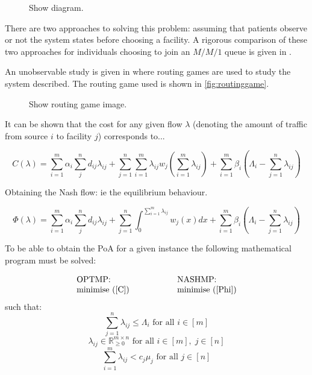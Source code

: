 \documentclass[a4paper,11pt]{article}
\begin{document}
\begin{figure}[!hbtp]
Show diagram.
\end{figure}

There are two approaches to solving this problem: assuming that patients observe or not the system states before choosing a facility.
A rigorous comparison of these two approaches for individuals choosing to join an $M/M/1$ queue is given in \cite{}.

An unobservable study is given in \cite{} where routing games \cite{Rouhgharden} are used to study the system described.
The routing game used is shown in \ref{fig:routinggame}.

\begin{figure}[!hbtp]
Show routing game image.
\end{figure}

It can be shown that the cost for any given flow $\lambda$ (denoting the amount of traffic from source $i$ to facility $j$) corresponds to...

\begin{equation}
C(\lambda)=\sum_{i=1}^m\alpha_i\sum_{j}^nd_{ij}\lambda_{ij}+\sum_{j=1}^n\sum_{i=1}^m\lambda_{ij}w_j\left(\sum_{i=1}^m\lambda_{ij}\right)+\sum_{i=1}^m\beta_i\left(\Lambda_i-\sum_{j=1}^n\lambda_{ij}\right)
\label{C}\end{equation}

Obtaining the Nash flow: ie the equilibrium behaviour.

\begin{equation}
\Phi(\lambda)=\sum_{i=1}^m\alpha_i\sum_{j}^nd_{ij}\lambda_{ij}+\sum_{j=1}^n\int_0^{\sum_{i=1}^m\lambda_{ij}}w_j(x)dx+\sum_{i=1}^m\beta_i\left(\Lambda_i-\sum_{j=1}^n\lambda_{ij}\right)
\label{Phi}\end{equation}

To be able to obtain the PoA for a given instance the following mathematical program must be solved:

$$\begin{array}{l@{\hspace{2cm}}l}\text{OPTMP:}&\text{NASHMP:}\\
\text{minimise }(\ref{C})&\text{minimise }(\ref{Phi})
\end{array}$$
such that:
\begin{equation}
\sum_{j=1}^n\lambda_{ij}\leq\Lambda_{i}\text{ for all }i\in[m]\label{constraint 1}
\end{equation}
\begin{equation}
\lambda_{ij}\in\mathbb{R}^{m\times n}_{\geq 0}\text{ for all }i\in[m],\;j\in[n]\label{constraint 2}
\end{equation}
\begin{equation}
\sum_{i=1}^m\lambda_{ij}<c_j\mu_j\text{ for all }j\in[n]\label{constraint 3}
\end{equation}
\end{document}
